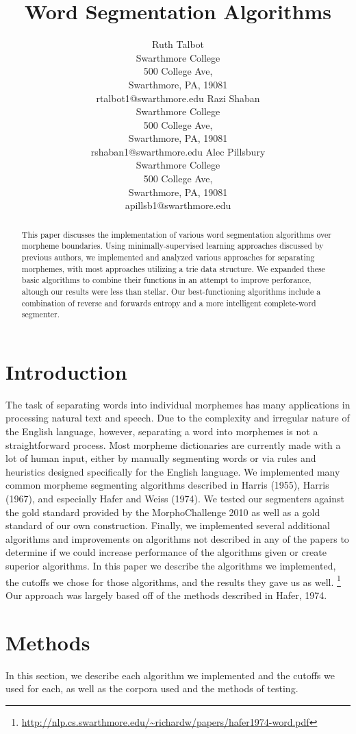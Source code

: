 \documentclass[11pt,letterpaper]{article}
\title{Word Segmentation Algorithms}
\author{Ruth Talbot\\
  Swarthmore College\\
  500 College Ave,\\ 
  Swarthmore, PA, 19081\\
  {rtalbot1@swarthmore.edu}  
  \And                           
  Razi Shaban\\                 
  Swarthmore College\\
  500 College Ave,\\
  Swarthmore, PA, 19081\\ 
  {rshaban1@swarthmore.edu}
  \And
  Alec Pillsbury\\ 
  Swarthmore College\\
  500 College Ave,\\
  Swarthmore, PA, 19081\\
  {apillsb1@swarthmore.edu}}
\date{}
\begin{document}
\maketitle
\begin{abstract}
This paper discusses the implementation of various word segmentation algorithms over morpheme boundaries. Using minimally-supervised learning approaches discussed by previous authors, we implemented and analyzed various approaches for separating morphemes, with most approaches utilizing a trie data structure. We expanded these basic algorithms to combine their functions in an attempt to improve perforance, altough our results were less than stellar. Our best-functioning algorithms include a combination of reverse and forwards entropy and a more intelligent complete-word segmenter.

\end{abstract}


\section{Introduction}

  The task of separating words into individual morphemes has many applications in processing natural text and speech.  Due to the complexity and irregular nature of the English language, however, separating a word into morphemes is not a straightforward process.  Most morpheme dictionaries are currently made with a lot of human input, either by manually segmenting words or via rules and heuristics designed specifically for the English language. We implemented many common morpheme segmenting algorithms described in Harris (1955), Harris (1967), and especially Hafer and Weiss (1974). We tested our segmenters against the gold standard provided by the MorphoChallenge 2010 as well as a gold standard of our own construction. Finally, we implemented several additional algorithms and improvements on algorithms not described in any of the papers to determine if we could increase performance of the algorithms given or create superior algorithms. In this paper we describe the algorithms we implemented, the cutoffs we chose for those algorithms, and the results they gave us as well. \footnote{\url{http://nlp.cs.swarthmore.edu/~richardw/papers/hafer1974-word.pdf}}  Our approach was largely based off of the methods described in Hafer, 1974.

\section{Methods}
In this section, we describe each algorithm we implemented and the cutoffs we used for each, as well as the corpora used and the methods of testing. 
\end{document}
